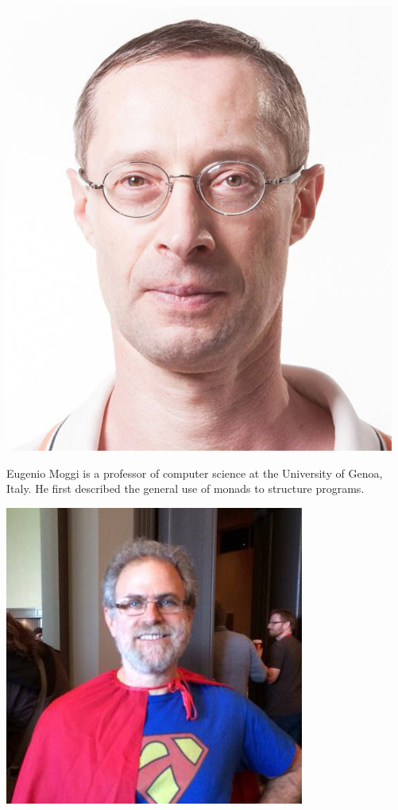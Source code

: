 \documentclass[12pt]{article}
\begin{document}
\begin{center}
\includegraphics[scale=0.3]{moggi}
\end{center}

Eugenio Moggi is a professor of computer science at the University of Genoa, Italy.
He first described the general use of monads to structure programs.

\begin{center}
\includegraphics[scale=0.45]{wadler}
\end{center}
\end{document}
